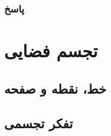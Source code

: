 \documentclass[12pt, a4paper]{book}
\begin{document}
\newpage

\subsection{پاسخ}
\chapter{تجسم فضایی}

\section{خط، نقطه و صفحه}

\section{تفکر تجسمی}

	
\end{document}
